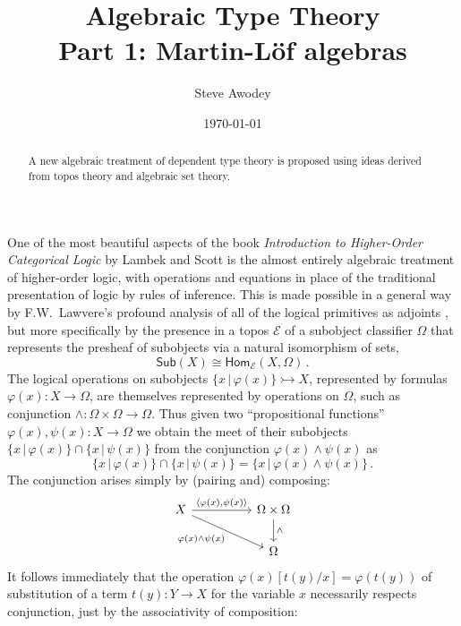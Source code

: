 \documentclass[12pt,reqno]{amsart}
\newcommand{\ednote}[1]{[\textit{\color{red}{#1}}]} %
\newcommand{\EE}{\ensuremath{\mathcal{E}}}
\newcommand{\Hom}{\ensuremath{\mathsf{Hom}}}
\newcommand{\mono}{\ensuremath{\rightarrowtail}}
\renewcommand{\to}{\ensuremath{\rightarrow}}
\theoremstyle{remark}
\theoremstyle{definition}
\begin{document}

\title{Algebraic Type Theory\\
Part 1: {M}artin-{L}\"of algebras}
\author{Steve Awodey}
\date{\today}

\begin{abstract}
A new algebraic treatment of dependent type theory is proposed using ideas derived from topos theory and algebraic set theory.
\end{abstract}
\maketitle


One of the most beautiful aspects of the book \emph{Introduction to Higher-Order Categorical Logic} by Lambek and Scott is the almost entirely algebraic treatment of higher-order logic, with operations and equations in place of the traditional presentation of logic by rules of inference.   This is made possible in a general way by F.W.\ Lawvere's profound analysis of all of the logical primitives as adjoints \cite{Lawvere:adjointness}, but more specifically by the presence in a topos $\EE$ of a subobject classifier $\Omega$ that represents the presheaf of subobjects via a natural isomorphism of sets,
\[
\mathsf{Sub}(X) \cong \Hom_{\EE}(X, \Omega)\,.
\]
The logical operations on subobjects $\{x\,|\, \varphi(x)\} \mono X$, represented by formulas $\varphi(x) : X \to \Omega$, are themselves represented by operations on $\Omega$, such as conjunction $\wedge : \Omega \times \Omega \to \Omega$.  Thus given two ``propositional functions'' $\varphi(x), \psi(x) : X \to \Omega$ we obtain the meet of their subobjects $\{x\,|\, \varphi(x)\}\cap \{x\,|\, \psi(x)\}$ from the conjunction $\varphi(x)\wedge\psi(x)$ as 
\[
\{x\,|\, \varphi(x)\}\cap \{x\,|\, \psi(x)\} = \{x\,|\, \varphi(x) \wedge \psi(x)\} \,.
\]
The conjunction arises simply by (pairing and) composing:
\begin{equation*}
\begin{tikzcd}
 X \ar[rr, "{\langle \varphi(x), \psi(x) \rangle}" ] \ar[rrd,swap,  "\varphi(x)\wedge\psi(x)"] && \Omega \times \Omega \ar[d, "\wedge"] \\
 && \Omega 
\end{tikzcd}
\end{equation*}
It follows immediately that the operation $\varphi(x)[t(y)/x] = \varphi(t(y))$ of substitution of a term $t(y) : Y\to X$ for the variable $x$ necessarily respects conjunction, just by the associativity of composition:
\end{document}
